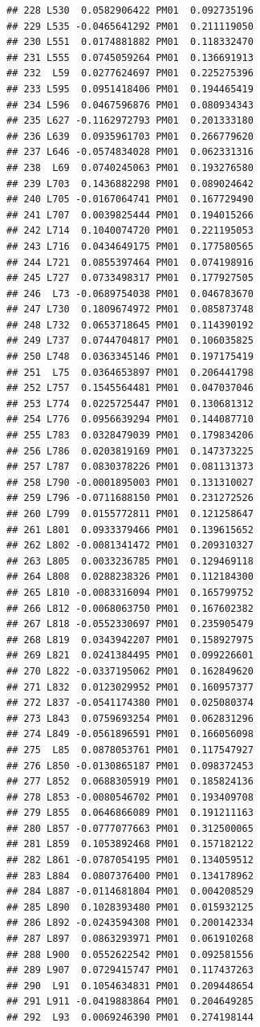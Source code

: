 \documentclass[
]{article}
\begin{document}
\begin{verbatim}
## 228 L530  0.0582906422 PM01  0.092735196
## 229 L535 -0.0465641292 PM01  0.211119050
## 230 L551  0.0174881882 PM01  0.118332470
## 231 L555  0.0745059264 PM01  0.136691913
## 232  L59  0.0277624697 PM01  0.225275396
## 233 L595  0.0951418406 PM01  0.194465419
## 234 L596  0.0467596876 PM01  0.080934343
## 235 L627 -0.1162972793 PM01  0.201333180
## 236 L639  0.0935961703 PM01  0.266779620
## 237 L646 -0.0574834028 PM01  0.062331316
## 238  L69  0.0740245063 PM01  0.193276580
## 239 L703  0.1436882298 PM01  0.089024642
## 240 L705 -0.0167064741 PM01  0.167729490
## 241 L707  0.0039825444 PM01  0.194015266
## 242 L714  0.1040074720 PM01  0.221195053
## 243 L716  0.0434649175 PM01  0.177580565
## 244 L721  0.0855397464 PM01  0.074198916
## 245 L727  0.0733498317 PM01  0.177927505
## 246  L73 -0.0689754038 PM01  0.046783670
## 247 L730  0.1809674972 PM01  0.085873748
## 248 L732  0.0653718645 PM01  0.114390192
## 249 L737  0.0744704817 PM01  0.106035825
## 250 L748  0.0363345146 PM01  0.197175419
## 251  L75  0.0364653897 PM01  0.206441798
## 252 L757  0.1545564481 PM01  0.047037046
## 253 L774  0.0225725447 PM01  0.130681312
## 254 L776  0.0956639294 PM01  0.144087710
## 255 L783  0.0328479039 PM01  0.179834206
## 256 L786  0.0203819169 PM01  0.147373225
## 257 L787  0.0830378226 PM01  0.081131373
## 258 L790 -0.0001895003 PM01  0.131310027
## 259 L796 -0.0711688150 PM01  0.231272526
## 260 L799  0.0155772811 PM01  0.121258647
## 261 L801  0.0933379466 PM01  0.139615652
## 262 L802 -0.0081341472 PM01  0.209310327
## 263 L805  0.0033236785 PM01  0.129469118
## 264 L808  0.0288238326 PM01  0.112184300
## 265 L810 -0.0083316094 PM01  0.165799752
## 266 L812 -0.0068063750 PM01  0.167602382
## 267 L818 -0.0552330697 PM01  0.235905479
## 268 L819  0.0343942207 PM01  0.158927975
## 269 L821  0.0241384495 PM01  0.099226601
## 270 L822 -0.0337195062 PM01  0.162849620
## 271 L832  0.0123029952 PM01  0.160957377
## 272 L837 -0.0541174380 PM01  0.025080374
## 273 L843  0.0759693254 PM01  0.062831296
## 274 L849 -0.0561896591 PM01  0.166056098
## 275  L85  0.0878053761 PM01  0.117547927
## 276 L850 -0.0130865187 PM01  0.098372453
## 277 L852  0.0688305919 PM01  0.185824136
## 278 L853 -0.0080546702 PM01  0.193409708
## 279 L855  0.0646866089 PM01  0.191211163
## 280 L857 -0.0777077663 PM01  0.312500065
## 281 L859  0.1053892468 PM01  0.157182122
## 282 L861 -0.0787054195 PM01  0.134059512
## 283 L884  0.0807376400 PM01  0.134178962
## 284 L887 -0.0114681804 PM01  0.004208529
## 285 L890  0.1028393480 PM01  0.015932125
## 286 L892 -0.0243594308 PM01  0.200142334
## 287 L897  0.0863293971 PM01  0.061910268
## 288 L900  0.0552622542 PM01  0.092581556
## 289 L907  0.0729415747 PM01  0.117437263
## 290  L91  0.1054634831 PM01  0.209448654
## 291 L911 -0.0419883864 PM01  0.204649285
## 292  L93  0.0069246390 PM01  0.274198144
\end{verbatim}
\end{document}
